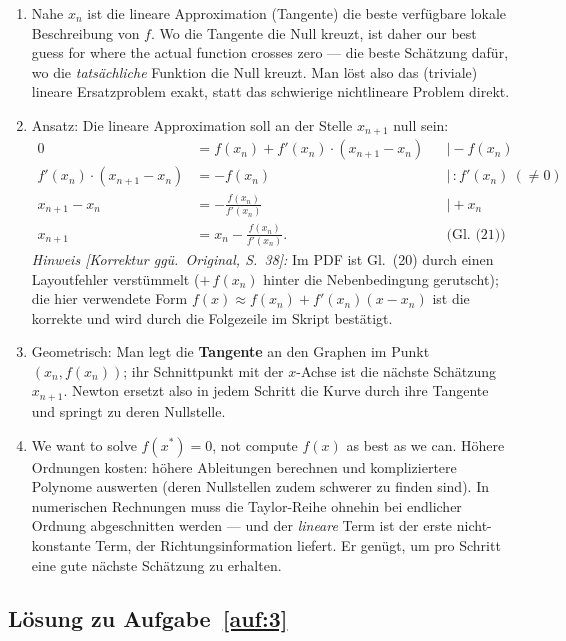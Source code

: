 \documentclass[a4paper,11pt]{scrartcl}
\begin{document}
\begin{enumerate}[label=(\alph*)]
  \item Nahe $x_n$ ist die lineare Approximation (Tangente) die beste verfügbare lokale
  Beschreibung von $f$. Wo die Tangente die Null kreuzt, ist daher \glqq our best guess
  for where the actual function crosses zero\grqq{} --- die beste Schätzung dafür, wo
  die \emph{tatsächliche} Funktion die Null kreuzt. Man löst also das (triviale) lineare
  Ersatzproblem exakt, statt das schwierige nichtlineare Problem direkt.
  \item Ansatz: Die lineare Approximation soll an der Stelle $x_{n+1}$ null sein:
  \begin{align*}
    0 &= f(x_n) + f'(x_n)\cdot(x_{n+1} - x_n) && \big| -f(x_n)\\
    f'(x_n)\cdot(x_{n+1} - x_n) &= -f(x_n) && \big| \, : f'(x_n) \ (\neq 0)\\
    x_{n+1} - x_n &= -\frac{f(x_n)}{f'(x_n)} && \big| + x_n\\[2pt]
    x_{n+1} &= x_n - \frac{f(x_n)}{f'(x_n)}. && \text{(Gl.~(21))}
  \end{align*}
  \emph{Hinweis [Korrektur ggü.\ Original, S.~38]:} Im PDF ist Gl.~(20) durch einen
  Layoutfehler verstümmelt (\glqq$+\,f(x_n)$\grqq{} hinter die Nebenbedingung gerutscht);
  die hier verwendete Form $f(x) \approx f(x_n) + f'(x_n)(x - x_n)$ ist die korrekte und
  wird durch die Folgezeile im Skript bestätigt.
  \item Geometrisch: Man legt die \textbf{Tangente} an den Graphen im Punkt
  $(x_n, f(x_n))$; ihr Schnittpunkt mit der $x$-Achse ist die nächste Schätzung
  $x_{n+1}$. Newton ersetzt also in jedem Schritt die Kurve durch ihre Tangente und
  springt zu deren Nullstelle.
  \item \glqq We want to solve $f(x^*) = 0$, not compute $f(x)$ as best as we can.\grqq{}
  Höhere Ordnungen kosten: höhere Ableitungen berechnen und kompliziertere Polynome
  auswerten (deren Nullstellen zudem schwerer zu finden sind). In numerischen Rechnungen
  muss die Taylor-Reihe ohnehin bei endlicher Ordnung abgeschnitten werden --- und der
  \emph{lineare} Term ist der erste nicht-konstante Term, der Richtungsinformation
  liefert. Er genügt, um pro Schritt eine gute nächste Schätzung zu erhalten.
\end{enumerate}

\subsection*{Lösung zu Aufgabe~\ref{auf:3}}
\end{document}
